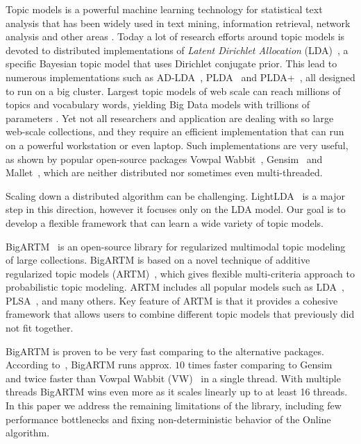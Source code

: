 \documentclass[russian,english]{llncs}
\begin{document}
Topic models \cite{blei12ptm} is a powerful machine learning technology for statistical text analysis
that has been widely used in text mining, information retrieval, network analysis and other areas \cite{daud10knowledge}.
Today a lot of research efforts around topic models is devoted to distributed implementations of
\emph{Latent Dirichlet Allocation} (LDA)~\cite{blei03latent},
a specific Bayesian topic model that uses Dirichlet conjugate prior.
This lead to numerous implementations such as
AD-LDA~\cite{newman09distributed}, PLDA~\cite{wang09plda} and PLDA{+}~\cite{liu11plda},
all designed to run on a big cluster.
Largest topic models of web scale can reach millions of topics and vocabulary words, 
yielding Big Data models with trillions of parameters \cite{yuan15lightlda}.
Yet not all researchers and application are dealing with so large web-scale collections,
and they require an efficient implementation that can run on a powerful workstation or even laptop.
Such implementations are very useful,
as shown by popular open-source packages
Vowpal Wabbit~\cite{langford07vw}, Gensim~\cite{rehurek10software} and Mallet~\cite{McCallum02mallet},
which are neither distributed nor sometimes even multi-threaded.

Scaling down a distributed algorithm can be challenging.
LightLDA~\cite{yuan15lightlda} is a major step in this direction,
however it focuses only on the LDA model.
Our goal is to develop a flexible framework that can learn a wide variety of topic models.

BigARTM~\cite{vfardi15aist} is an open-source library for
regularized multimodal topic modeling of large collections.
BigARTM is based on a novel technique of additive regularized topic models (ARTM)~\cite{voron14dan-eng,voron14aist,voron15mlj,voron15nonbayesian},
which gives flexible multi-criteria approach to probabilistic topic modeling.
ARTM includes all popular models such as 
LDA~\cite{blei03latent}, 
PLSA~\cite{hofmann99plsi},
and many others.
Key feature of ARTM is that it provides a cohesive framework that allows users to combine
different topic models that previously did not fit together.

BigARTM is proven to be very fast comparing to the alternative packages.
According to~\cite{vfardi15aist}, BigARTM
runs approx. $10$ times faster comparing to Gensim~\cite{rehurek10software}
and twice faster than
Vowpal Wabbit (VW)~\cite{langford07vw}
in a single thread.
With multiple threads BigARTM wins even more
as it scales linearly up to at least 16 threads.
In this paper we address the remaining limitations of the library,
including few performance bottlenecks
and fixing non-deterministic behavior of the Online algorithm.
\end{document}

